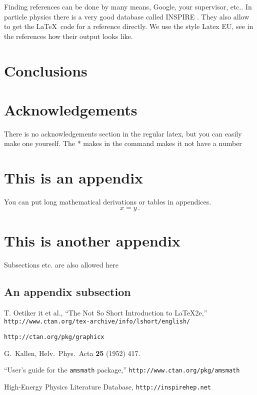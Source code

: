 \documentclass[a4paper,12pt]{article}
\begin{document}
Finding references can be done by many means, Google, your supervisor, etc..
In particle physics there is a very good database called INSPIRE
\cite{inspire}. They also allow to get the \LaTeX\ code for a reference
directly. We use the style Latex EU, see \cite{Kallen:1952zz} in the references
how their output looks like.

\section{Conclusions}
\setcounter{equation}{0}

\section*{Acknowledgements}

There is no acknowledgements section in the regular latex, but you can easily
make one yourself. The * makes in the command makes it not have a number

\appendix

\section{This is an appendix}
\setcounter{equation}{0}

You can put long mathematical derivations or tables in appendices.
\begin{equation}
\label{appendixequation}
x = y\,.
\end{equation}

\section{This is another appendix}
\setcounter{equation}{0}

Subsections etc. are also allowed here

\subsection{An appendix subsection}


\begin{thebibliography}{99}
T. Oetiker {it et al.}, ``The Not So Short Introduction to \LaTeX2e,''
{\tt http://www.ctan.org/tex-archive/info/lshort/english/}

{\tt http://ctan.org/pkg/graphicx}

G.~Kallen,
Helv.\ Phys.\ Acta {\bf 25} (1952) 417.

``User's guide for the {\tt amsmath} package,''
{\tt http://www.ctan.org/pkg/amsmath}

 High-Energy Physics Literature Database,
{\tt http://inspirehep.net}

\end{thebibliography}
\end{document}
